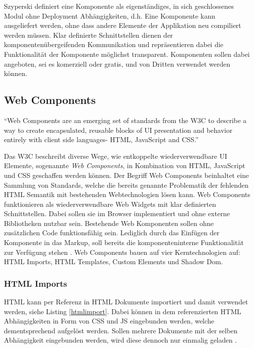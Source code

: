 Szyperski definiert eine Komponente als eigenständiges, in sich geschlossenes Modul ohne Deployment
Abhängigkeiten, d.h. Eine Komponente kann ausgeliefert werden, ohne dass andere Elemente der Applikation neu compiliert werden müssen.
Klar definierte Schnittstellen dienen der komponentenübergeifenden Kommunikation und repräsentieren
dabei die Funktionalität der Komponente möglichst transparent.
Komponenten sollen dabei angeboten, sei es komerziell oder gratis,
und von Dritten verwendet werden können.


\subsection{Web Components}

``Web Components are an emerging set of standards from the W3C to describe a way to create encapsulated,
reusable blocks of UI presentation and behavior entirely with client side languages- HTML, JavaScript and CSS.''
\cite[42]{Web-Component-Architecture}
\vspace{0.3cm}

Das \ac{W3C} beschreibt diverse Wege, wie entkoppelte wiederverwendbare UI Elemente, sogenannte \emph{Web Components},
in Kombination von \ac{HTML}, JavaScript und \ac{CSS} geschaffen werden können.
Der Begriff Web Components beinhaltet eine Sammlung von Standards,
welche die bereits genannte Problematik der fehlenden HTML Semantik mit bestehenden Webtechnologien lösen kann.
Web Components funktionieren als wiederverwendbare Web Widgets mit klar definierten Schnittstellen.
Dabei sollen sie im Browser implementiert und ohne externe Bibliotheken nutzbar sein.
Bestehende Web Komponenten sollen ohne zusätzlichen Code funktionsfähig sein. Lediglich durch das Einfügen der Komponente
in das Markup, soll bereits die komponenteninterne Funktionalität zur Verfügung stehen
\cite[42]{Web-Component-Architecture}.
Web Components bauen auf vier Kerntechnologien auf: HTML Imports, HTML Templates, Custom Elements und Shadow Dom.

\subsubsection{HTML Imports}
HTML kann per Referenz in HTML Dokumente importiert und damit verwendet werden, siehe Listing \ref{htmlimport}.
Dabei können in dem referenzierten HTML Abhängigkeiten in Form von CSS und JS eingebunden werden,
welche dementsprechend aufgelöst werden.
Sollen mehrere Dokumente mit der selben Abhängigkeit eingebunden werden, wird diese dennoch nur einmalig geladen
\cite{HTMLI44:online}.

